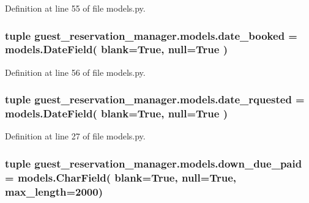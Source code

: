 Definition at line 55 of file models.\-py.

\hypertarget{namespaceguest__reservation__manager_1_1models_a22af95f3c472c6b3ca4ef3b1e4fdfaa8}{
\subsubsection[{date\-\_\-booked}]{\setlength{\rightskip}{0pt plus 5cm}tuple guest\-\_\-reservation\-\_\-manager.\-models.\-date\-\_\-booked = models.\-Date\-Field( blank=True, null=True )}}\label{namespaceguest__reservation__manager_1_1models_a22af95f3c472c6b3ca4ef3b1e4fdfaa8}


Definition at line 56 of file models.\-py.

\hypertarget{namespaceguest__reservation__manager_1_1models_a3c1ebd1cf4a68a2a43143419ff894da0}{
\subsubsection[{date\-\_\-rquested}]{\setlength{\rightskip}{0pt plus 5cm}tuple guest\-\_\-reservation\-\_\-manager.\-models.\-date\-\_\-rquested = models.\-Date\-Field( blank=True, null=True )}}\label{namespaceguest__reservation__manager_1_1models_a3c1ebd1cf4a68a2a43143419ff894da0}


Definition at line 27 of file models.\-py.

\hypertarget{namespaceguest__reservation__manager_1_1models_a097bc34e22cdc6a370c8eeb619db4f63}{
\subsubsection[{down\-\_\-due\-\_\-paid}]{\setlength{\rightskip}{0pt plus 5cm}tuple guest\-\_\-reservation\-\_\-manager.\-models.\-down\-\_\-due\-\_\-paid = models.\-Char\-Field( blank=True, null=True, max\-\_\-length=2000)}}\label{namespaceguest__reservation__manager_1_1models_a097bc34e22cdc6a370c8eeb619db4f63}


